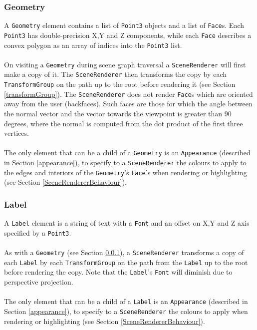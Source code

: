 \documentclass[10pt,aps, prb,preprint]{article}
\begin{document}


\subsubsection{Geometry}
\label{geometry}
A \texttt{Geometry} element contains a list of \texttt{Point3} objects and a list of \texttt{Face}s. Each \texttt{Point3} has double-precision X,Y and Z components, while each \texttt{Face} describes a convex polygon as an array of indices into the \texttt{Point3} list.
\\
\\
On visiting a \texttt{Geometry} during scene graph traversal a \texttt{SceneRenderer} will first make a copy of it. The \texttt{SceneRenderer} then transforms the copy by each \texttt{TransformGroup} on the path up to the root before rendering it (see Section \ref{transformGroup}). The \texttt{SceneRenderer} does not render \texttt{Face}s which are oriented away from the user (backfaces). Such faces are those for which the angle between the normal vector and the vector towards the viewpoint is greater than 90 degrees, where the normal is computed from the dot product of the first three vertices.
\\
\\
The only element that can be a child of a \texttt{Geometry} is an \texttt{Appearance} (described in Section \ref{appearance}), to specify to a \texttt{SceneRenderer} the colours to apply to the edges and interiors of the \texttt{Geometry}'s \texttt{Face}'s when rendering or highlighting (see Section \ref{SceneRendererBehaviour}).



\subsubsection{Label}
\label{label}
A \texttt{Label} element is a string of text with a \texttt{Font} and an offset on X,Y and Z axis specified by a \texttt{Point3}.
\\
\\
As with a \texttt{Geometry} (see Section \ref{geometry}), a \texttt{SceneRenderer} transforms a copy of each \texttt{Label} by each \texttt{TransformGroup} on the path from the \texttt{Label} up to the root before rendering the copy. Note that the \texttt{Label}'s \texttt{Font} will diminish due to perspective projection.
\\
\\
The only element that can be a child of a \texttt{Label} is an \texttt{Appearance} (described in Section \ref{appearance}), to specify to a \texttt{SceneRenderer} the colours to apply when rendering or highlighting (see Section \ref{SceneRendererBehaviour}).
\end{document}
